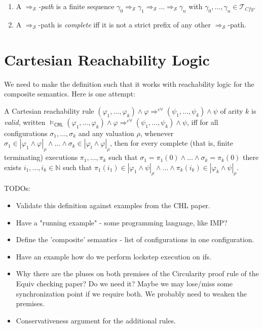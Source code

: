\documentclass{article}
\newcommand{\CRL}{\mathsf{CRL}}
\newcommand{\Tcfg}{\mathcal{T}_{\mathit{Cfg}}}
\begin{document}
\begin{definition}
\begin{enumerate}
    \item A \emph{$\Rightarrow_{\mathcal{S}}$-path} is a finite
          sequence $\gamma_0 \Rightarrow_{\mathcal{S}} \gamma_1 \Rightarrow_{\mathcal{S}} \ldots \Rightarrow_{\mathcal{S}} \gamma_n$
          with $\gamma_0,\ldots,\gamma_n \in \Tcfg$.
          
    \item A $\Rightarrow_{\mathcal{S}}$-path is \emph{complete}
          iff it is not a strict prefix of any
          other $\Rightarrow_{\mathcal{S}}$-path.
\end{enumerate}

\end{definition}

\section{Cartesian Reachability Logic}

We need to make the definition such that it works with reachability logic for the composite semantics.
Here is one attempt:
\begin{definition}\label{def:CRLsemantics}
A Cartesian reachability rule
$(\varphi_1,\ldots,\varphi_k) \land \varphi \Rightarrow^{c\forall} (\psi_1,\ldots,\psi_k) \land \psi$
of arity $k$
is \emph{valid},
written
$\vDash_\CRL (\varphi_1,\ldots,\varphi_k) \land \varphi \Rightarrow^{c\forall}
(\psi_1,\ldots,\psi_k) \land \psi$,
iff for all configurations $\sigma_1,\ldots,\sigma_k$ and any valuation $\rho$,
whenever $\sigma_1 \in |\varphi_1 \land \varphi|_\rho \land \ldots \land \sigma_k \in |\varphi_l \land \varphi|_\rho$,
then for every complete (that is, finite terminating) executions $\pi_1, \ldots, \pi_k$ such that
$\sigma_1 = \pi_1(0) \land \ldots \land \sigma_k = \pi_k(0)$ there exists $i_1,\ldots,i_k \in \mathbb{N}$
such that
$\pi_1(i_1) \in |\varphi_1 \land \psi|_\rho \land \ldots \land \pi_k(i_k) \in |\varphi_k \land \psi|_\rho$.
\end{definition}

TODOs:
\begin{itemize}
    \item Validate this definition against examples from the CHL paper.
    \item Have a "running example" - some programming language, like IMP?
    \item Define the 'composite' semantics - list of configurations in one configuration.
    \item Have an example how do we perform lockstep execution on ifs.
    \item Why there are the pluses on both premises of the Circularity proof rule of the Equiv checking paper? Do we need it? Maybe we may lose/miss some synchronization point if we require both. We probably need to weaken the premises.
    \item Conservativeness argument for the additional rules.
\end{itemize}
\end{document}

